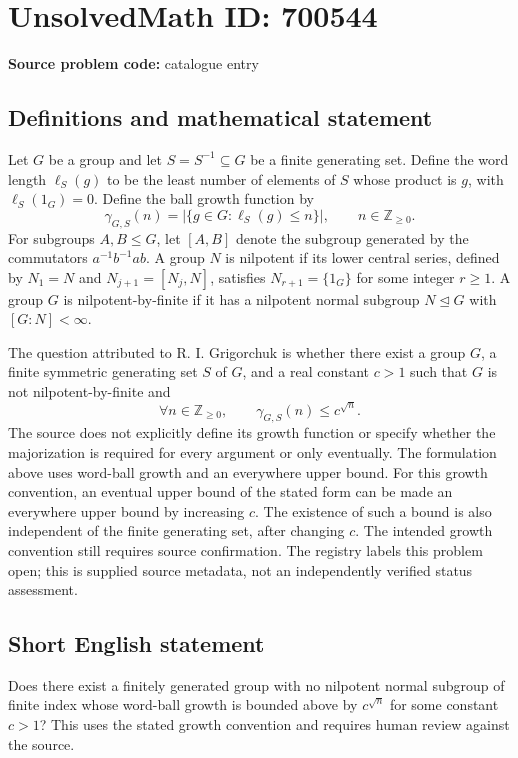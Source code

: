 \documentclass[11pt]{article}
\newcommand{\Z}{\mathbb{Z}}
\begin{document}
\section*{UnsolvedMath ID: 700544}
\textbf{Source problem code:} catalogue entry
\subsection{Definitions and mathematical statement}
Let \(G\) be a group and let \(S=S^{-1}\subseteq G\) be a finite generating set. Define the word length \(\ell_S(g)\) to be the least number of elements of \(S\) whose product is \(g\), with \(\ell_S(1_G)=0\). Define the ball growth function by
\[
\gamma_{G,S}(n)=\bigl|\{g\in G:\ell_S(g)\leq n\}\bigr|,
\qquad n\in\Z_{\geq 0}.
\]
For subgroups \(A,B\leq G\), let \([A,B]\) denote the subgroup generated by the commutators \(a^{-1}b^{-1}ab\). A group \(N\) is nilpotent if its lower central series, defined by \(N_1=N\) and \(N_{j+1}=[N_j,N]\), satisfies \(N_{r+1}=\{1_G\}\) for some integer \(r\geq 1\). A group \(G\) is nilpotent-by-finite if it has a nilpotent normal subgroup \(N\trianglelefteq G\) with \([G:N]<\infty\).

The question attributed to R. I. Grigorchuk is whether there exist a group \(G\), a finite symmetric generating set \(S\) of \(G\), and a real constant \(c>1\) such that \(G\) is not nilpotent-by-finite and
\[
\forall n\in\Z_{\geq 0},\qquad \gamma_{G,S}(n)\leq c^{\sqrt n}.
\]
The source does not explicitly define its growth function or specify whether the majorization is required for every argument or only eventually. The formulation above uses word-ball growth and an everywhere upper bound. For this growth convention, an eventual upper bound of the stated form can be made an everywhere upper bound by increasing \(c\). The existence of such a bound is also independent of the finite generating set, after changing \(c\). The intended growth convention still requires source confirmation. The registry labels this problem open; this is supplied source metadata, not an independently verified status assessment.
\subsection{Short English statement}
Does there exist a finitely generated group with no nilpotent normal subgroup of finite index whose word-ball growth is bounded above by \(c^{\sqrt n}\) for some constant \(c>1\)? This uses the stated growth convention and requires human review against the source.
\end{document}
